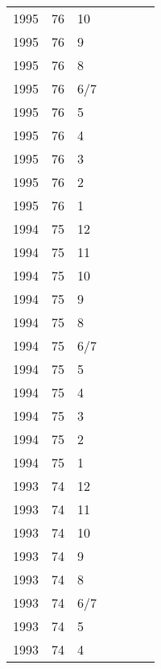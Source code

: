 \begin{longtable}{ |l|l|l|l|p{2.7cm}|l|p{2cm}| }
 1995 & 76 &    10 &         &                &  & \\
 1995 & 76 &     9 &         &                &  & \\
 1995 & 76 &     8 &         &                &  & \\
 1995 & 76 &   6/7 &         &                &  & \\
 1995 & 76 &     5 &         &                &  & \\
 1995 & 76 &     4 &         &                &  & \\
 1995 & 76 &     3 &         &                &  & \\
 1995 & 76 &     2 &         &                &  & \\
 1995 & 76 &     1 &         &                &  & \\
 1994 & 75 &    12 &         &                &  & \\
 1994 & 75 &    11 &         &                &  & \\
 1994 & 75 &    10 &         &                &  & \\
 1994 & 75 &     9 &         &                &  & \\
 1994 & 75 &     8 &         &                &  & \\
 1994 & 75 &   6/7 &         &                &  & \\
 1994 & 75 &     5 &         &                &   & \\
 1994 & 75 &     4 &         &                &  & \\
 1994 & 75 &     3 &         &                &  & \\
 1994 & 75 &     2 &         &                &  & \\
 1994 & 75 &     1 &         &                &  & \\
 1993 & 74 &    12 &         &                &  & \\
 1993 & 74 &    11 &         &                &  & \\
 1993 & 74 &    10 &         &                &  & \\
 1993 & 74 &     9 &         &                &  & \\
 1993 & 74 &     8 &         &                &  & \\
 1993 & 74 &   6/7 &         &                &  & \\
 1993 & 74 &     5 &         &                &  & \\
 1993 & 74 &     4 &         &                &  & \\

\end{longtable}
